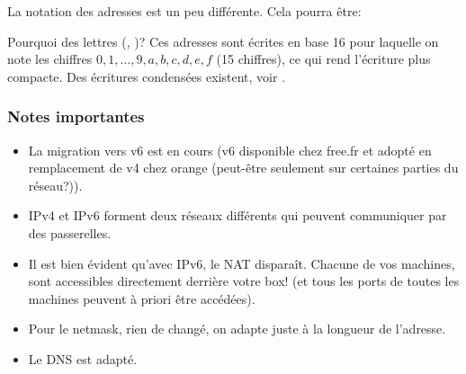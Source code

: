   La notation des adresses est un peu différente. Cela pourra être:


  Pourquoi des lettres (, )? Ces  adresses sont écrites
  en base 16 pour laquelle on note les chiffres
  $0,1,\ldots,9,a,b,c,d,e,f$ (15 chiffres), ce qui rend l'écriture plus
  compacte. Des écritures condensées existent, voir \cite{v6}.

  \subsubsection{Notes importantes}
  \begin{itemize}
    \item La migration vers v6 est en cours (v6 disponible chez
    free.fr et adopté en remplacement de v4 chez orange (peut-être
    seulement sur certaines parties du réseau?)).
    \item IPv4 et IPv6 forment deux réseaux différents qui peuvent
      communiquer par des passerelles.
    \item Il est bien évident qu'avec IPv6, le NAT disparaît. Chacune
      de vos machines, sont accessibles directement derrière votre
      box! (et tous les ports de toutes les machines peuvent à priori
      être accédées).
    \item Pour le netmask, rien de changé, on adapte juste à la
      longueur de l'adresse.
    \item Le DNS est adapté.
  \end{itemize}


    
